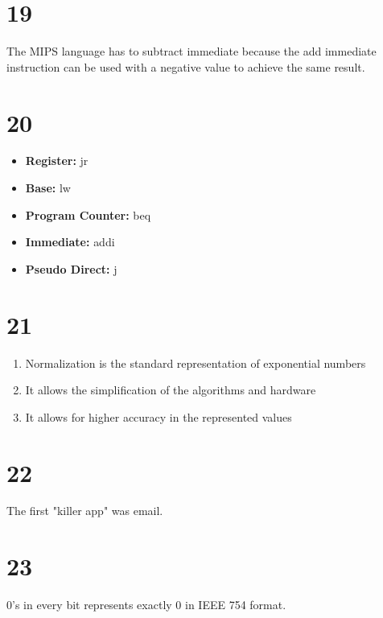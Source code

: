 \documentclass[a4paper,11pt]{article}
\begin{document}
\section*{19}
The MIPS language has to subtract immediate because the add immediate instruction can be used with a negative value to achieve the same result.  

\section*{20}
\begin{itemize}
  \item {\bf Register: } jr
  \item {\bf Base: } lw
  \item {\bf Program Counter: } beq
  \item {\bf Immediate: } addi
  \item {\bf Pseudo Direct:}  j
\end{itemize}


\section*{21}

\begin{enumerate}
  \item Normalization is the standard representation of exponential numbers
  \item It allows the simplification of the algorithms and hardware
  \item It allows for higher accuracy in the represented values
\end{enumerate}


\section*{22}
The first "killer app" was email.

\section*{23}
0's in every bit represents exactly 0 in IEEE 754 format.

\end{document}
